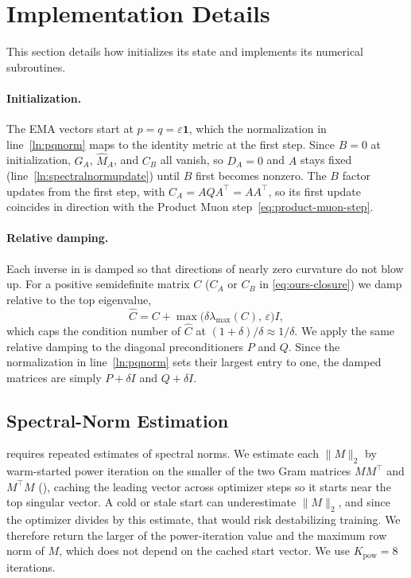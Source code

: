 \documentclass[11pt]{article}
\newcommand{\norm}[1]{\| #1\|}
\theoremstyle{plain}
\theoremstyle{definition}
\theoremstyle{remark}
\theoremstyle{definition}
\begin{document}
\clearpage
\section{Implementation Details}
\label{app:primitives}
This section details how  initializes its state and implements
its numerical subroutines.

\paragraph{Initialization.}\label{app:init}
The EMA vectors start at $p = q = \varepsilon\mathbf{1}$, which the
normalization in line~\ref{ln:pqnorm} maps to the identity metric at the first
step. Since $B=0$ at initialization, $G_A$, $\widehat M_A$, and $C_B$ all
vanish, so $D_A=0$ and $A$ stays fixed (line~\ref{ln:spectralnormupdate}) until
$B$ first becomes nonzero. The $B$ factor updates from the first step, with
$C_A = AQA^\top = AA^\top$, so its first update coincides in direction with the
Product Muon step~\eqref{eq:product-muon-step}.

\paragraph{Relative damping.}\label{app:damping}
Each inverse in  is damped so that directions of
nearly zero curvature do not blow up. For a positive
semidefinite matrix $C$ ($C_A$ or $C_B$ in \eqref{eq:ours-closure}) we damp relative to the top eigenvalue,
\[
    \widehat{C} = C + \max\bigl(\delta\lambda_{\max}(C),\, \varepsilon\bigr) I,
\]
which caps the condition number of $\widehat{C}$ at $(1+\delta)/\delta \approx 1/\delta$.
We apply the same relative damping to the diagonal preconditioners $P$ and $Q$.
Since the normalization in line~\ref{ln:pqnorm} sets their largest entry to
one, the damped matrices are simply $P+\delta I$ and $Q+\delta I$.

\subsection{Spectral-Norm Estimation}
\label{app:smax}
 requires repeated estimates of spectral norms.  
We estimate each $\norm{M}_2$ by warm-started power iteration on the smaller of the two Gram matrices $MM^\top$ and $M^\top M$ (), caching the leading vector across optimizer steps so it starts near the top singular vector. A cold or stale start
can underestimate $\norm{M}_2$, and since the optimizer divides by this estimate, that would risk destabilizing training.  We therefore return the larger of the power-iteration value and the maximum row norm of $M$, which does not depend on the cached start vector. We use $K_{\mathrm{pow}} = 8$ iterations.
\end{document}
